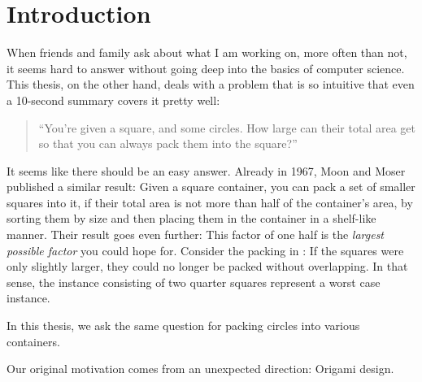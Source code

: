\documentclass[a4paper,style=print,bibliography=totoc,nexus,lnum,extramargin]{tubsbook}
\begin{document}
\cleardoublepage
\setcounter{tocdepth}{1}

\tableofcontents
\cleardoublepage

\mainmatter %

\chapter{Introduction}

When friends and family ask about what I am working on, more often than not, it seems hard to answer without going deep into the basics of computer science. This thesis, on the other hand, deals with a problem that is so intuitive that even a 10-second summary covers it pretty well:

\begin{quote}
    “You're given a square, and some circles. How large can their total area get so that you can always pack them into the square?”
\end{quote}

It seems like there should be an easy answer. Already in 1967, Moon and Moser published a similar result: Given a square container, you can pack a set of smaller squares into it, if their total area is not more than half of the container's area, by sorting them by size and then placing them in the container in a shelf-like manner. Their result goes even further: This factor of one half is the \emph{largest possible factor} you could hope for. Consider the packing in : If the squares were only slightly larger, they could no longer be packed without overlapping. In that sense, the instance consisting of two quarter squares represent a worst case instance.


In this thesis, we ask the same question for packing circles into various containers.

Our original motivation comes from an unexpected direction: Origami design.


\end{document}

